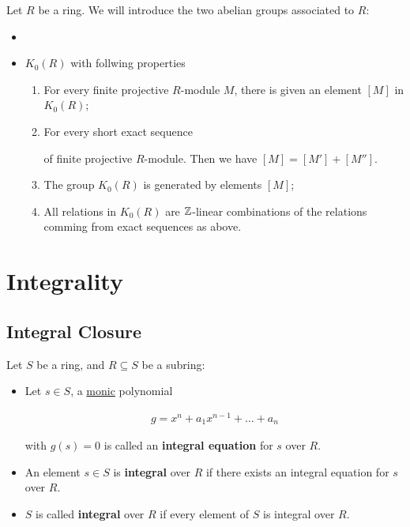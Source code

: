 \documentclass[Total.tex]{subfiles}
\begin{document}
			\begin{Def}
				Let $R$ be a ring. We will introduce the two abelian groups associated to $R$:
				
				\begin{itemize}
					\item 
					\item $K_0(R)$ with follwing properties
					
					\begin{enumerate}
						\item For every finite projective $R$-module $M$, there is given an element $[M]$ in $K_0(R)$;
						\item For every short exact sequence
						\begin{center}
						\end{center}
						of finite projective $R$-module. Then we have $[M]=[M']+[M'']$.
						
						\item The group $K_0(R)$ is generated by elements $[M]$;
						\item All relations in $K_0(R)$ are $\mathbb{Z}$-linear combinations of the relations comming from exact sequences as above.
					\end{enumerate}
				\end{itemize}
			\end{Def}
			
	\chapter{Integrality}
	
		\section{Integral Closure}
		
			\begin{Def}
				Let $S$ be a ring, and $R\subseteq S$ be a subring:
				
				\begin{itemize}
					\item Let $s\in S$, a \underline{monic} polynomial
					
					\begin{gather*}
						g=x^n+a_1x^{n-1}+\dots+a_n
					\end{gather*}
					
					with $g(s)=0$ is called an \textbf{integral equation} for $s$ over $R$.
					
					\item An element $s\in S$ is \textbf{integral} over $R$ if there exists an integral equation for $s$ over $R$.
					\item $S$ is called \textbf{integral} over $R$ if every element of $S$ is integral over $R$.
				\end{itemize}
			\end{Def}
			
\end{document}
